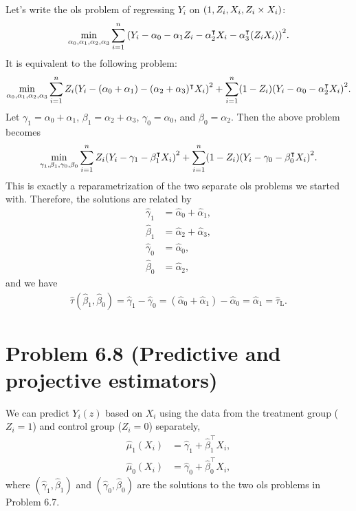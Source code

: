 \documentclass[10pt]{article}
\begin{document}
Let's write the \gls{ols} problem of regressing $Y_i$ on ${\left( 1, Z_i, X_i, Z_i \times X_i \right)}$:
\begin{align*}
  \min_{\alpha_0, \alpha_1, \alpha_2, \alpha_3}
  \sum_{i=1}^n {\left( Y_i - \alpha_0 - \alpha_1 Z_i - 
    \alpha_2^\intercal X_i - \alpha_3^\intercal (Z_i X_i) \right)}^2.
\end{align*}
It is equivalent to the following problem:
\begin{align*}
  \min_{\alpha_0, \alpha_1, \alpha_2, \alpha_3}
  \sum_{i=1}^n Z_i {\left( Y_i - (\alpha_0 + \alpha_1) - (\alpha_2 + \alpha_3)^\intercal X_i \right)}^2
  + \sum_{i=1}^n (1 - Z_i) {\left( Y_i - \alpha_0 - \alpha_2^\intercal X_i \right)}^2.
\end{align*}
Let $\gamma_1 = \alpha_0 + \alpha_1$, $\beta_1 = \alpha_2 + \alpha_3$, $\gamma_0 = \alpha_0$, and $\beta_0 = \alpha_2$.
Then the above problem becomes
\begin{align*}
  \min_{\gamma_1, \beta_1, \gamma_0, \beta_0}
  \sum_{i=1}^n Z_i {\left( Y_i - \gamma_1 - \beta_1^\intercal X_i \right)}^2
  + \sum_{i=1}^n (1 - Z_i) {\left( Y_i - \gamma_0 - \beta_0^\intercal X_i \right)}^2.
\end{align*}
This is exactly a reparametrization of the two separate \gls{ols} problems we started with.
Therefore, the solutions are related by
\begin{align*}
  \hat{\gamma}_1 &= \hat{\alpha}_0 + \hat{\alpha}_1, \\
  \hat{\beta}_1 &= \hat{\alpha}_2 + \hat{\alpha}_3, \\
  \hat{\gamma}_0 &= \hat{\alpha}_0, \\
  \hat{\beta}_0 &= \hat{\alpha}_2,
\end{align*}
and we have
\begin{align*}
  \hat{\tau}(\hat{\beta}_1, \hat{\beta}_0)
  = \hat{\gamma}_1 - \hat{\gamma}_0 
  = (\hat{\alpha}_0 + \hat{\alpha}_1) - \hat{\alpha}_0 
  = \hat{\alpha}_1 
  = \hat{\tau}_{\text{L}}.
\end{align*}

\section*{Problem 6.8 (Predictive and projective estimators)}

We can predict $Y_i(z)$ based on $X_i$ using the data 
from the treatment group ($Z_i =1$) and control group ($Z_i = 0$) separately,
\begin{align*}
  \hat{\mu}_1(X_i) &= \hat{\gamma}_1 + \hat{\beta}_1^\intercal X_i, \\
  \hat{\mu}_0(X_i) &= \hat{\gamma}_0 + \hat{\beta}_0^\intercal X_i,
\end{align*}
where $(\hat{\gamma}_1, \hat{\beta}_1)$ and $(\hat{\gamma}_0, \hat{\beta}_0)$
are the solutions to the two \gls{ols} problems in Problem 6.7.
\end{document}
